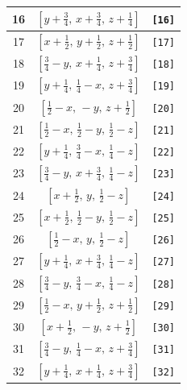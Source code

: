 \documentclass[fleqn,8pt]{jsarticle}
\begin{document}
\begin{longtable}{ccc}
16 & $\left[ y + \frac{3}{4},\, x + \frac{3}{4},\, z + \frac{1}{4} \right]$ & {\tt [16]} \\ \hline
17 & $\left[ x + \frac{1}{2},\, y + \frac{1}{2},\, z + \frac{1}{2} \right]$ & {\tt [17]} \\ \hline
18 & $\left[ \frac{3}{4} - y,\, x + \frac{1}{4},\, z + \frac{3}{4} \right]$ & {\tt [18]} \\ \hline
19 & $\left[ y + \frac{1}{4},\, \frac{1}{4} - x,\, z + \frac{3}{4} \right]$ & {\tt [19]} \\ \hline
20 & $\left[ \frac{1}{2} - x,\, - y,\, z + \frac{1}{2} \right]$ & {\tt [20]} \\ \hline
21 & $\left[ \frac{1}{2} - x,\, \frac{1}{2} - y,\, \frac{1}{2} - z \right]$ & {\tt [21]} \\ \hline
22 & $\left[ y + \frac{1}{4},\, \frac{3}{4} - x,\, \frac{1}{4} - z \right]$ & {\tt [22]} \\ \hline
23 & $\left[ \frac{3}{4} - y,\, x + \frac{3}{4},\, \frac{1}{4} - z \right]$ & {\tt [23]} \\ \hline
24 & $\left[ x + \frac{1}{2},\, y,\, \frac{1}{2} - z \right]$ & {\tt [24]} \\ \hline
25 & $\left[ x + \frac{1}{2},\, \frac{1}{2} - y,\, \frac{1}{2} - z \right]$ & {\tt [25]} \\ \hline
26 & $\left[ \frac{1}{2} - x,\, y,\, \frac{1}{2} - z \right]$ & {\tt [26]} \\ \hline
27 & $\left[ y + \frac{1}{4},\, x + \frac{3}{4},\, \frac{1}{4} - z \right]$ & {\tt [27]} \\ \hline
28 & $\left[ \frac{3}{4} - y,\, \frac{3}{4} - x,\, \frac{1}{4} - z \right]$ & {\tt [28]} \\ \hline
29 & $\left[ \frac{1}{2} - x,\, y + \frac{1}{2},\, z + \frac{1}{2} \right]$ & {\tt [29]} \\ \hline
30 & $\left[ x + \frac{1}{2},\, - y,\, z + \frac{1}{2} \right]$ & {\tt [30]} \\ \hline
31 & $\left[ \frac{3}{4} - y,\, \frac{1}{4} - x,\, z + \frac{3}{4} \right]$ & {\tt [31]} \\ \hline
32 & $\left[ y + \frac{1}{4},\, x + \frac{1}{4},\, z + \frac{3}{4} \right]$ & {\tt [32]} \\
\end{longtable}
\end{document}
